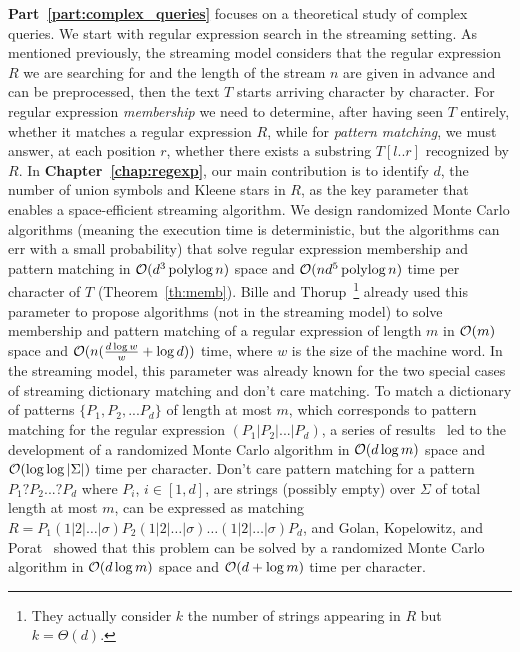 \textbf{Part~\ref{part:complex_queries}} focuses on a theoretical study of complex queries. 
%
We start with regular expression search in the streaming setting.
%
As mentioned previously, the streaming model considers that the regular expression $R$ we are searching for and the length of the stream $n$ are given in advance and can be preprocessed, then the text $T$ starts arriving character by character. For regular expression \emph{membership} we need to determine, after having seen $T$ entirely, whether it matches a regular expression $R$, while for \emph{pattern matching}, we must answer, at each position $r$, whether there exists a substring $T[l..r]$ recognized by $R$.
In \textbf{Chapter~\ref{chap:regexp}}, our main contribution is to identify $d$, the number of union symbols and Kleene stars in $R$, as the key parameter that enables a space-efficient streaming algorithm. We design randomized Monte Carlo algorithms (meaning the execution time is deterministic, but the algorithms can err with a small probability) that solve regular expression membership and pattern matching in $\mathcal{O}(d^3\operatorname{polylog} n)$ space and $\mathcal{O}(nd^5\operatorname{polylog} n)$ time per character of $T$ (Theorem~\ref{th:memb}).
Bille and Thorup~\cite{doi:10.1137/1.9781611973075.104}\footnote{They actually consider $k$ the number of strings appearing in $R$ but $k=\Theta(d)$.} already used this parameter to propose algorithms (not in the streaming model) to solve membership and pattern matching of a regular expression of length $m$ in $\mathcal{O}(m)$ space and $\mathcal{O}(n(\frac{d\log w}{w} + \log d))$ time, where $w$ is the size of the machine word.
In the streaming model, this parameter was already known for the two special cases of streaming dictionary matching and don't care matching. To match a dictionary of patterns $\{P_1, P_2, ... P_d \}$ of length at most $m$, which corresponds to pattern matching for the regular expression $(P_1| P_2| ... | P_d)$, a series of results~\cite{Porat:09,DBLP:journals/talg/BreslauerG14,DBLP:conf/esa/CliffordFPSS15,DBLP:conf/esa/GolanP17,DBLP:conf/icalp/GolanKP18} led to the development of a randomized Monte Carlo algorithm in $\mathcal{O}(d\log m)$ space and $\mathcal{O}(\log \log |\Sigma|)$ time per character.
Don't care pattern matching for a pattern $P_1 ? P_2 ... ? P_d$ where $P_i$, $i \in [1,d]$, are strings (possibly empty) over $\Sigma$ of total length at most $m$, can be expressed as matching $R = P_1 (1|2|\ldots|\sigma) P_2 (1|2|\ldots|\sigma) \ldots (1|2|\ldots|\sigma) P_{d}$, and Golan, Kopelowitz, and Porat~\cite{DBLP:journals/algorithmica/GolanKP19} showed that this problem can be solved by a randomized Monte Carlo algorithm in $\mathcal{O}(d \log m)$ space and $\mathcal{O}(d+\log m)$ time per character.

